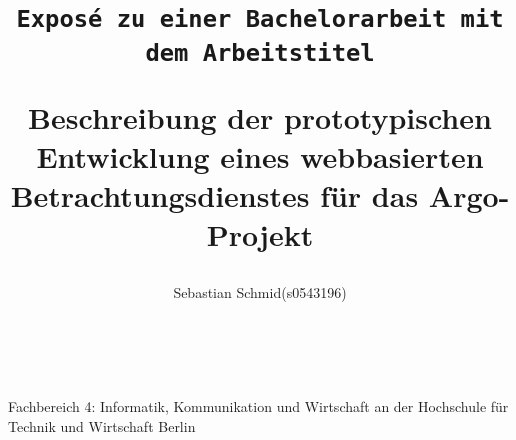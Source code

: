 

\title{ {\texttt{Exposé zu einer Bachelorarbeit mit dem Arbeitstitel}}
	\vfill
    \begin{center}
	Beschreibung der prototypischen Entwicklung eines webbasierten Betrachtungsdienstes für das Argo-Projekt
	\end{center}\vfill
}

\author{
	\begin{tabular}{ll}
        Sebastian Schmid&(s0543196)
	\end{tabular}\\\\}
    
% 


 
\setcounter{page}{-1}
\maketitle\thispagestyle{empty}
\begin{center}
 \small{Fachbereich 4: Informatik, Kommunikation und Wirtschaft an der Hochschule für Technik und Wirtschaft Berlin }
\end{center}
\newpage

\tableofcontents\thispagestyle{empty}

\newpage










%
 
